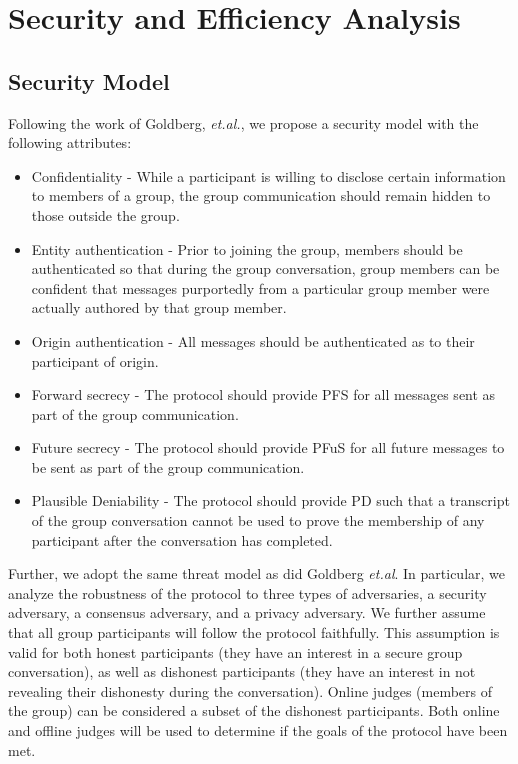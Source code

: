 \documentclass[%
preprint,
amsmath,amssymb,
aps,
prb,
floatfix,
]{revtex4-1}
\begin{document}
\section{\label{sec:analysis}Security and Efficiency Analysis}

\subsection{\label{sec:securitymodel}Security Model}
Following the work of Goldberg, \textit{et.al.}\cite{ref:goldberg}, we propose a
security model with the following attributes:
\begin{itemize}
\item Confidentiality - While a participant is willing to disclose certain
information to members of a group, the group communication should remain hidden
to those outside the group.
\item Entity authentication - Prior to joining the group, members should be
authenticated so that during the group conversation, group members can be
confident that messages purportedly from a particular group member were
actually authored by that group member.
\item Origin authentication - All messages should be authenticated as to their
participant of origin.
\item Forward secrecy - The protocol should provide PFS for all messages sent as
part of the group communication.
\item Future secrecy - The protocol should provide PFuS for all future messages
to be sent as part of the group communication.
\item Plausible Deniability - The protocol should provide PD such that a
transcript of the group conversation cannot be used to prove the membership of
any participant after the conversation has completed.
\end{itemize}

Further, we adopt the same threat model as did Goldberg
\textit{et.al}\cite{ref:goldberg}. In particular, we analyze the robustness of
the protocol to three types of adversaries, a security adversary, a consensus
adversary, and a privacy adversary. We further assume that all group
participants will follow the protocol faithfully. This assumption is valid for
both honest participants (they have an interest in a secure group conversation),
as well as dishonest participants (they have an interest in not revealing their
dishonesty during the conversation).  Online judges (members of the group) can
be considered a subset of the dishonest participants. Both online and offline
judges will be used to determine if the goals of the protocol have been met.
\end{document}
